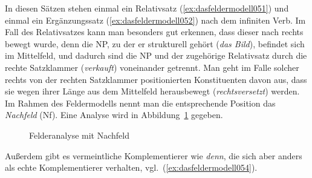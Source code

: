 \begin{exe}
  \ex\label{ex:dasfeldermodell050}
  \begin{xlist}
  \end{xlist}
\end{exe}


In diesen Sätzen stehen einmal ein Relativsatz (\ref{ex:dasfeldermodell051}) und einmal ein Ergänzungssatz (\ref{ex:dasfeldermodell052}) nach dem infiniten Verb.
Im Fall des Relativsatzes kann man besonders gut erkennen, dass dieser nach rechts bewegt wurde, denn die NP, zu der er strukturell gehört (\textit{das Bild}), befindet sich im Mittelfeld, und dadurch sind die NP und der zugehörige Relativsatz durch die rechte Satzklammer (\textit{verkauft}) voneinander getrennt.
Man geht im Falle solcher rechts von der rechten Satzklammer positionierten Konstituenten davon aus, dass sie wegen ihrer Länge aus dem Mittelfeld herausbewegt (\textit{rechtsversetzt}) werden.
Im Rahmen des Feldermodells nennt man die entsprechende Position das \textit{Nachfeld} (Nf).
Eine Analyse wird in Abbildung~\ref{fig:dasfeldermodell053} gegeben.


\begin{figure}[!htbp]
  \centering
  \caption{Felderanalyse mit Nachfeld}
  \label{fig:dasfeldermodell053}
\end{figure}

Außerdem gibt es vermeintliche Komplementierer wie \textit{denn}, die sich aber anders als echte Komplementierer verhalten, vgl.\ (\ref{ex:dasfeldermodell054}).

\begin{exe}
  \ex\label{ex:dasfeldermodell054}
  \begin{xlist}
  \end{xlist}
\end{exe}

